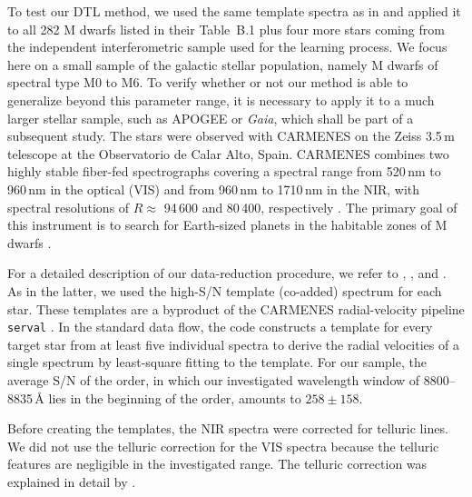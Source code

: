 \documentclass{aa}
\begin{document}
To test our DTL method, we used the same template spectra as in \cite{Passegger2019} and applied it to all 282 M dwarfs listed in their Table~B.1 plus four more stars coming from the independent interferometric sample used for the learning process. 
We focus here on a small sample of the galactic stellar population, namely M dwarfs of spectral type M0 to M6. To verify whether or not our method is able to generalize beyond this parameter range, it is necessary to apply it to a much larger stellar sample, such as APOGEE or {\it Gaia}, which shall be part of a subsequent study.
The stars were observed with CARMENES on the Zeiss 3.5\,m telescope at the Observatorio de Calar Alto, Spain. 
CARMENES combines two highly stable fiber-fed spectrographs covering a spectral range from 520\,nm to 960\,nm in the optical (VIS) and from 960\,nm to 1710\,nm in the NIR, with spectral resolutions of $R \approx$ 94\,600 and 80\,400, respectively \citep{Quirrenbach2018,Reiners2018a}.
The primary goal of this instrument is to search for Earth-sized planets in the habitable zones of M dwarfs \citep[e.g.,][]{Zechmeister2019}.

For a detailed description of our data-reduction procedure, we refer to \cite{Zechmeister2014}, \cite{Caballero2016}, and \cite{Passegger2019}. 
As in the latter, we used the high-S/N template (co-added) spectrum for each star. These templates are a byproduct of the CARMENES radial-velocity pipeline {\tt serval} 
\citep[SpEctrum Radial Velocity AnaLyser;][]{Zechmeister2018}. In the standard data flow, the code constructs a template for every target star from at least five individual spectra to derive the radial velocities of a single spectrum by least-square fitting to the template. 
For our sample, the average S/N of the order, in which our investigated wavelength window of 8800--8835\,\AA{} lies in the beginning of the order, amounts to $258 \pm 158$.


Before creating the templates, the NIR spectra were corrected for telluric lines. We did not use the telluric correction for the VIS spectra because the telluric features are negligible in the investigated range. The telluric correction was explained in detail by \cite{Nagel2022}. 
\end{document}
